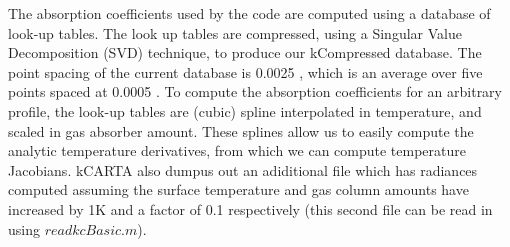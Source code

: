 \documentclass[12pt]{article}
\newcommand{\kc}{\textsf{kCARTA}\xspace}
\begin{document}
The absorption coefficients used by the code are computed using a
database of look-up tables.  The look up tables are compressed, using
a Singular Value Decomposition ({\sf SVD}) technique, to produce our
{\sf kCompressed} database.  The point spacing of the current database is
0.0025 \wn, which is an average over five points spaced at 0.0005
\wn.  To compute the absorption coefficients for an arbitrary
profile, the look-up tables are (cubic) spline interpolated in
temperature, and scaled in gas absorber amount.  These splines allow
us to easily compute the analytic temperature derivatives, from
which we can compute temperature Jacobians. \kc also dumpus out an adiditional
file which has radiances computed assuming the surface temperature and 
gas column amounts have increased by 1K and a factor of 0.1 respectively
(this second file can be read in using $readkcBasic.m$).
\end{document}
